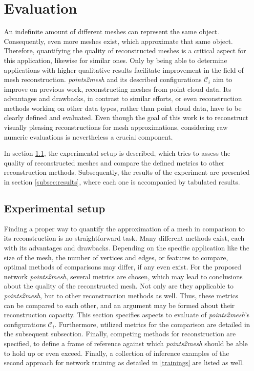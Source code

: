 \chapter{Evaluation}
\label{chap:evaluation}

    An indefinite amount of different meshes can represent the same object.
    Consequently, even more meshes exist, which approximate that same object. 
    Therefore, quantifying the quality of reconstructed meshes is a critical aspect for 
    this application, likewise for similar ones. Only by being able to determine applications
    with higher qualitative results facilitate improvement in the field of mesh 
    reconstruction. 
    \emph{points2mesh} and its described configurations $\mathcal{C}_i$ aim to improve on previous work,
    reconstructing meshes from point cloud data. Its advantages and drawbacks, in contrast to similar efforts, 
    or even reconstruction methods working on other data types, rather than point cloud data, have to be clearly
    defined and evaluated.
    Even though the goal of this work is to reconstruct visually pleasing reconstructions for mesh approximations, 
    considering raw numeric evaluations is nevertheless a crucial component.

    In section \ref{subsec:exp}, the experimental setup is described, which tries to assess
    the quality of reconstructed meshes and compare the defined metrics to other reconstruction methods. 
    Subsequently, the results of the experiment are presented in section \ref{subsec:results}, where
    each one is accompanied by tabulated results.


\section{Experimental setup}
\label{subsec:exp}

    Finding a proper way to quantify the approximation of a mesh in comparison to its reconstruction is no straightforward task.
    Many different methods exist, each with its advantages and drawbacks. Depending on the specific application like the size of
    the mesh, the number of vertices and edges, or features to compare, optimal methods of comparisons may differ, if any even
    exist. For the proposed network \emph{points2mesh}, several metrics are chosen, which may lead to conclusions about the quality 
    of the reconstructed mesh. Not only are they applicable to \emph{points2mesh}, but to other reconstruction methods as well. 
    Thus, these metrics can be compared to each other, and an argument may be formed about their reconstruction capacity. This 
    section specifies aspects to evaluate of \emph{points2mesh}'s configurations $\mathcal{C}_i$. Furthermore, utilized metrics 
    for the comparison are detailed in the subsequent subsection. Finally, competing methods for reconstruction are specified,
    to define a frame of reference against which \emph{points2mesh} should be able to hold up or even exceed.
    Finally, a collection of inference examples of the second approach for network training as detailed in \ref{trainings} are listed as well.


